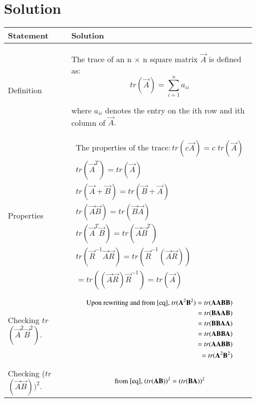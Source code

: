 \documentclass[journal,12pt,onecolumn]{IEEEtran}
\begin{document}
\section{Solution}
\begin{longtable}{|p{5cm}|p{13cm}|}
\hline
\textbf{Statement} &\textbf{Solution}\\
\hline
Definition & The trace of an n × n square matrix $\vec{A}$ is defined as:
\begin{displaymath}tr({\vec{A}}) = \sum_{i=1}^n a_{ii} \end{displaymath}

where $a_{ii}$ denotes the entry on the ith row and ith column of $\vec{A}.$ \\
\hline
Properties&
\parbox{12cm}{\begin{align}\text{The properties of the trace}:
tr(c{\vec{A}})=c\;tr({\vec{A}})\\
tr({\vec{A}}^T)=tr({\vec{A}})\\
tr({\vec{A}}+{\vec{B}})=tr({\vec{B}}+{\vec{A}})\\
tr({\vec{A}}{\vec{B}})=tr({\vec{B}}{\vec{A}})\label{eq}\\
tr({\vec{A}}^T{\vec{B}})=tr({\vec{A}}{\vec{B}}^T)\\
tr({\vec{R}}^{-1}{\vec{A}}{\vec{R}})=tr({\vec{R}}^{-1}({\vec{A}}{\vec{R}}))\\
=tr(({\vec{A}}{\vec{R}}){\vec{R}}^{-1})=tr({\vec{A}})
\end{align}}\\
\hline
Checking $tr$$(\vec{A}^2 \vec{B}^2).$ &
\parbox{12cm}{\begin{align}
 \text{Upon rewriting and from \eqref{eq}, } tr(\vec{A}^2 \vec{B}^2)=tr(\vec{A}\vec{A} \vec{B}\vec{B})\\
           = tr(\vec{B}\vec{A} \vec{A}\vec{B})\\
           = tr(\vec{B}\vec{B} \vec{A}\vec{A})\\
           = tr(\vec{A}\vec{B} \vec{B}\vec{A})\label{eq1}\\
           = tr(\vec{A}\vec{A} \vec{B}\vec{B})\\
           = tr(\vec{A}^2 \vec{B}^2)\label{eq2}
\end{align}}\\
\hline
Checking ($tr$$(\vec{A} \vec{B}))^2.$&
\parbox{12cm}{\begin{align}\text{from \eqref{eq},}\
    (tr(\vec{A} \vec{B}))^2=(tr(\vec{B} \vec{A}))^2
\end{align}}\\

\end{longtable}
\end{document}
